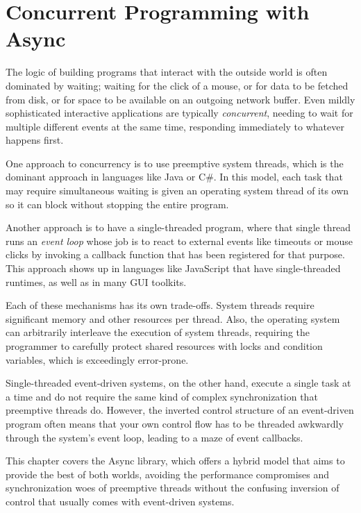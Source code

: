 \hypertarget{concurrent-programming-with-async}{%
\section{Concurrent Programming with
Async}\label{concurrent-programming-with-async}}

The logic of building programs that interact with the outside world is
often dominated by waiting; waiting for the click of a mouse, or for
data to be fetched from disk, or for space to be available on an
outgoing network buffer. Even mildly sophisticated interactive
applications are typically \emph{concurrent}, needing to wait for
multiple different events at the same time, responding immediately to
whatever happens first. 

One approach to concurrency is to use preemptive system threads, which
is the dominant approach in languages like Java or C\#. In this model,
each task that may require simultaneous waiting is given an operating
system thread of its own so it can block without stopping the entire
program. 

Another approach is to have a single-threaded program, where that single
thread runs an \emph{event loop} whose job is to react to external
events like timeouts or mouse clicks by invoking a callback function
that has been registered for that purpose. This approach shows up in
languages like JavaScript that have single-threaded runtimes, as well as
in many GUI toolkits. 

Each of these mechanisms has its own trade-offs. System threads require
significant memory and other resources per thread. Also, the operating
system can arbitrarily interleave the execution of system threads,
requiring the programmer to carefully protect shared resources with
locks and condition variables, which is exceedingly error-prone.

Single-threaded event-driven systems, on the other hand, execute a
single task at a time and do not require the same kind of complex
synchronization that preemptive threads do. However, the inverted
control structure of an event-driven program often means that your own
control flow has to be threaded awkwardly through the system's event
loop, leading to a maze of event callbacks.

This chapter covers the Async library, which offers a hybrid model that
aims to provide the best of both worlds, avoiding the performance
compromises and synchronization woes of preemptive threads without the
confusing inversion of control that usually comes with event-driven
systems. 

